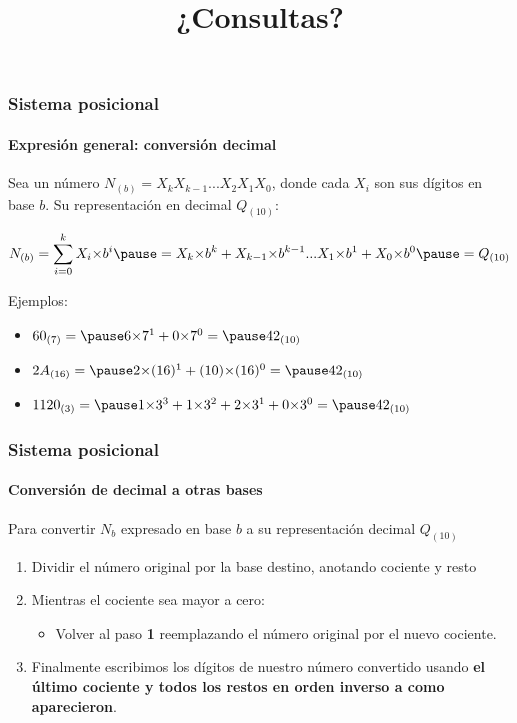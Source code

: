 \documentclass[11pt,a4paper,spanish]{beamer}
\begin{document}
\begin{frame}

\frametitle{Sistema posicional}
\framesubtitle{Expresión general: conversión decimal}

    Sea un número $N_{(b)} = X_{k}X_{k-1}...X_{2}X_{1}X_{0}$, donde cada $X_{i}$ son sus
    dígitos en base $b$. Su representación en decimal $Q_{(10)}$:

\begin{equation*}
    N_{(b)} = \displaystyle\sum_{i=0}^{k} X_{i}{\times}b^{i}
    \pause
    =
    X_{k}{\times}b^{k}+X_{k-1}{\times}b^{k-1}...
        X_{1}{\times}b^{1}+X_{0}{\times}b^{0}
    \pause
    = Q_{(10)}
\end{equation*}
\pause

Ejemplos:
\pause
\begin{itemize}
    \item
        $60_{(7)} = \pause
        6{\times}7^1+0{\times}7^0 = \pause
        42_{(10)}$\pause
    \item $2A_{(16)} = \pause
        2{\times}(16)^1+(10){\times}(16)^0 = \pause
        42_{(10)}$\pause
    \item $1120_{(3)} = \pause
        1{\times}3^3+1{\times}3^2+2{\times}3^1+0{\times}3^0 = \pause
        42_{(10)}$
\end{itemize}

\end{frame}

\begin{frame}

\title{¿Consultas?}
\maketitle

\end{frame}

\begin{frame}

\frametitle{Sistema posicional}
\framesubtitle{Conversión de decimal a otras bases}

    Para convertir $N_{b}$ expresado en base $b$ a su representación decimal
    $Q_{(10)}$
    \begin{enumerate}
        \item Dividir el número original por la base destino, anotando
            cociente y resto
    \item Mientras el cociente sea mayor a cero:
        \begin{itemize}
            \item Volver al paso \textbf{1} reemplazando el número original
                por el nuevo cociente.
        \end{itemize}
    \item Finalmente escribimos los dígitos de nuestro número convertido
        usando \textbf{el último cociente y todos los restos en orden inverso
            a como aparecieron}.
    \end{enumerate}

\end{frame}
\end{document}
